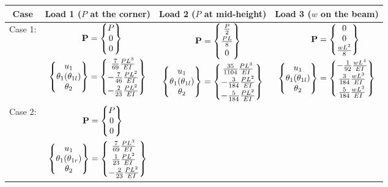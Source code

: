 \begin{example}
\leavevmode
\begin{fig}
  
\end{fig}
{\scriptsize
\renewcommand{\arraystretch}{1.0}
\begin{longtable}{|c|c|c|c|}\hline
  \textbf{Case} & Load 1 ($P$ at the corner) & Load 2 ($P$ at mid-height) & Load 3 ($w$ on the beam)\\\hline
  \shortstack{Case 1:\\[2pt] } &
  $\begin{aligned}\mathbf{P} &= \begin{Bmatrix}P\\ 0\\ 0\end{Bmatrix}\\ \begin{Bmatrix}u_1\\ \theta_1(\theta_{1l})\\ \theta_2\end{Bmatrix} &= \begin{Bmatrix}\frac{7}{69}\frac{PL^3}{EI}\\[2pt] -\frac{7}{46}\frac{PL^2}{EI}\\[2pt] -\frac{2}{23}\frac{PL^2}{EI}\end{Bmatrix}\end{aligned}$ &
  $\begin{aligned}\mathbf{P} &= \begin{Bmatrix}\frac P2\\[2pt] \frac{PL}{8}\\[2pt] 0\end{Bmatrix}\\ \begin{Bmatrix}u_1\\ \theta_1(\theta_{1l})\\ \theta_2\end{Bmatrix} &= \begin{Bmatrix}\frac{35}{1104}\frac{PL^3}{EI}\\[2pt] -\frac{3}{184}\frac{PL^2}{EI}\\[2pt] -\frac{5}{184}\frac{PL^2}{EI}\end{Bmatrix}\end{aligned}$ &
  $\begin{aligned}\mathbf{P} &= \begin{Bmatrix}0\\ 0\\ \frac{wL^2}{8}\end{Bmatrix}\\ \begin{Bmatrix}u_1\\ \theta_1(\theta_{1l})\\ \theta_2\end{Bmatrix} &= \begin{Bmatrix}-\frac{1}{92}\frac{wL^4}{EI}\\[2pt] \frac{3}{184}\frac{wL^3}{EI}\\[2pt] \frac{5}{184}\frac{wL^3}{EI}\end{Bmatrix}\end{aligned}$\\\hline
  \shortstack{Case 2:\\[2pt] } &
  $\begin{aligned}\mathbf{P} &= \begin{Bmatrix}P\\ 0\\ 0\end{Bmatrix}\\ \begin{Bmatrix}u_1\\ \theta_1(\theta_{1r})\\ \theta_2\end{Bmatrix} &= \begin{Bmatrix}\frac{7}{69}\frac{PL^3}{EI}\\[2pt] \frac{1}{23}\frac{PL^2}{EI}\\[2pt] -\frac{2}{23}\frac{PL^2}{EI}\end{Bmatrix}\end{aligned}$ &

\end{longtable}}
\end{example}
